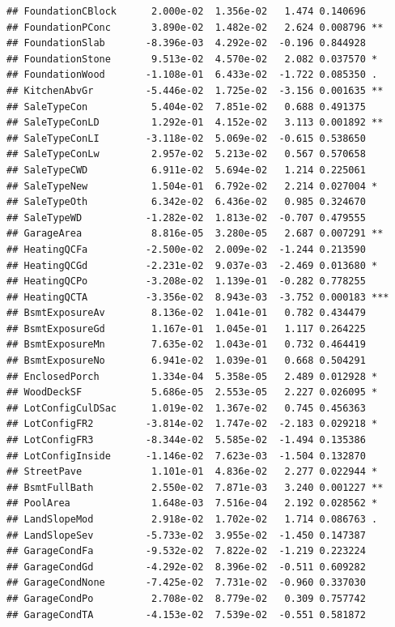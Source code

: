\documentclass[american,]{article}
\theoremstyle{definition}
\theoremstyle{definition}
\theoremstyle{definition}
\theoremstyle{remark}
\begin{document}
\begin{verbatim}
## FoundationCBlock      2.000e-02  1.356e-02   1.474 0.140696    
## FoundationPConc       3.890e-02  1.482e-02   2.624 0.008796 ** 
## FoundationSlab       -8.396e-03  4.292e-02  -0.196 0.844928    
## FoundationStone       9.513e-02  4.570e-02   2.082 0.037570 *  
## FoundationWood       -1.108e-01  6.433e-02  -1.722 0.085350 .  
## KitchenAbvGr         -5.446e-02  1.725e-02  -3.156 0.001635 ** 
## SaleTypeCon           5.404e-02  7.851e-02   0.688 0.491375    
## SaleTypeConLD         1.292e-01  4.152e-02   3.113 0.001892 ** 
## SaleTypeConLI        -3.118e-02  5.069e-02  -0.615 0.538650    
## SaleTypeConLw         2.957e-02  5.213e-02   0.567 0.570658    
## SaleTypeCWD           6.911e-02  5.694e-02   1.214 0.225061    
## SaleTypeNew           1.504e-01  6.792e-02   2.214 0.027004 *  
## SaleTypeOth           6.342e-02  6.436e-02   0.985 0.324670    
## SaleTypeWD           -1.282e-02  1.813e-02  -0.707 0.479555    
## GarageArea            8.816e-05  3.280e-05   2.687 0.007291 ** 
## HeatingQCFa          -2.500e-02  2.009e-02  -1.244 0.213590    
## HeatingQCGd          -2.231e-02  9.037e-03  -2.469 0.013680 *  
## HeatingQCPo          -3.208e-02  1.139e-01  -0.282 0.778255    
## HeatingQCTA          -3.356e-02  8.943e-03  -3.752 0.000183 ***
## BsmtExposureAv        8.136e-02  1.041e-01   0.782 0.434479    
## BsmtExposureGd        1.167e-01  1.045e-01   1.117 0.264225    
## BsmtExposureMn        7.635e-02  1.043e-01   0.732 0.464419    
## BsmtExposureNo        6.941e-02  1.039e-01   0.668 0.504291    
## EnclosedPorch         1.334e-04  5.358e-05   2.489 0.012928 *  
## WoodDeckSF            5.686e-05  2.553e-05   2.227 0.026095 *  
## LotConfigCulDSac      1.019e-02  1.367e-02   0.745 0.456363    
## LotConfigFR2         -3.814e-02  1.747e-02  -2.183 0.029218 *  
## LotConfigFR3         -8.344e-02  5.585e-02  -1.494 0.135386    
## LotConfigInside      -1.146e-02  7.623e-03  -1.504 0.132870    
## StreetPave            1.101e-01  4.836e-02   2.277 0.022944 *  
## BsmtFullBath          2.550e-02  7.871e-03   3.240 0.001227 ** 
## PoolArea              1.648e-03  7.516e-04   2.192 0.028562 *  
## LandSlopeMod          2.918e-02  1.702e-02   1.714 0.086763 .  
## LandSlopeSev         -5.733e-02  3.955e-02  -1.450 0.147387    
## GarageCondFa         -9.532e-02  7.822e-02  -1.219 0.223224    
## GarageCondGd         -4.292e-02  8.396e-02  -0.511 0.609282    
## GarageCondNone       -7.425e-02  7.731e-02  -0.960 0.337030    
## GarageCondPo          2.708e-02  8.779e-02   0.309 0.757742    
## GarageCondTA         -4.153e-02  7.539e-02  -0.551 0.581872    

\end{verbatim}
\end{document}
